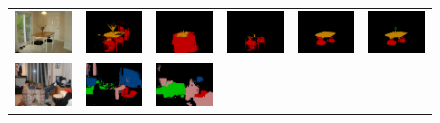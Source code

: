 \begin{figure}[p]
{\begin{tabular}{c c c c c c}
\hline \hline
    \includegraphics[height=0.11\linewidth]{fig/val_crf_vis/img/2007_000830.jpg} &
    \includegraphics[height=0.11\linewidth]{fig/val_crf_vis/adaweak/2007_000830.png} &
    \includegraphics[height=0.11\linewidth]{fig/val_crf_vis/bbox/2007_000830.png} &
    \includegraphics[height=0.11\linewidth]{fig/val_crf_vis/bbox_crf/2007_000830.png} &
    \includegraphics[height=0.11\linewidth]{fig/val_crf_vis/strongweak/2007_000830.png} &
    \includegraphics[height=0.11\linewidth]{fig/val_crf_vis/cocomix/2007_000830.png} \\
    \includegraphics[height=0.11\linewidth]{fig/val_crf_vis/img/2007_001175.jpg} &
    \includegraphics[height=0.11\linewidth]{fig/val_crf_vis/adaweak/2007_001175.png} &
    \includegraphics[height=0.11\linewidth]{fig/val_crf_vis/bbox/2007_001175.png} &

\end{tabular}}
\end{figure}
